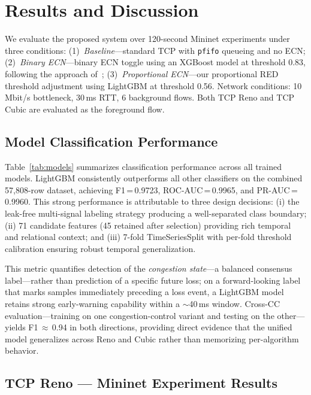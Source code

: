 \documentclass[journal]{IEEEtran}
\begin{document}
\section{Results and Discussion}
\label{sec:results}

We evaluate the proposed system over 120-second Mininet experiments under three conditions: (1)~\emph{Baseline}---standard TCP with \texttt{pfifo} queueing and no ECN; (2)~\emph{Binary ECN}---binary ECN toggle using an XGBoost model at threshold 0.83, following the approach of~\cite{welzl2024}; (3)~\emph{Proportional ECN}---our proportional RED threshold adjustment using LightGBM at threshold 0.56. Network conditions: 10\,Mbit/s bottleneck, 30\,ms RTT, 6 background flows. Both TCP Reno and TCP Cubic are evaluated as the foreground flow.

\subsection{Model Classification Performance}

Table~\ref{tab:models} summarizes classification performance across all trained models. LightGBM consistently outperforms all other classifiers on the combined 57,808-row dataset, achieving F1\,=\,0.9723, ROC-AUC\,=\,0.9965, and PR-AUC\,=\,0.9960. This strong performance is attributable to three design decisions: (i) the leak-free multi-signal labeling strategy producing a well-separated class boundary; (ii) 71 candidate features (45 retained after selection) providing rich temporal and relational context; and (iii) 7-fold TimeSeriesSplit with per-fold threshold calibration ensuring robust temporal generalization.

This metric quantifies detection of the \emph{congestion state}---a balanced consensus label---rather than prediction of a specific future loss; on a forward-looking label that marks samples immediately preceding a loss event, a LightGBM model retains strong early-warning capability within a $\sim$40\,ms window. Cross-CC evaluation---training on one congestion-control variant and testing on the other---yields F1\,$\approx$\,0.94 in both directions, providing direct evidence that the unified model generalizes across Reno and Cubic rather than memorizing per-algorithm behavior.

\subsection{TCP Reno --- Mininet Experiment Results}
\end{document}
